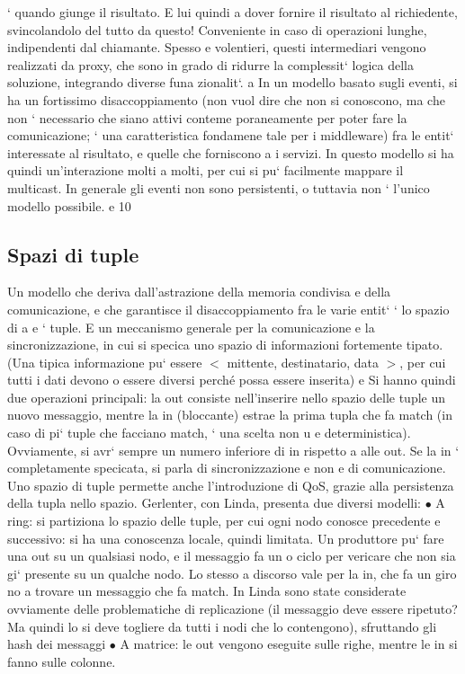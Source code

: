\documentclass[a4paper,12pt]{article}
\begin{document}
`
quando giunge il risultato. E lui quindi a dover fornire il risultato al
richiedente, svincolandolo del tutto da questo! Conveniente in caso di
operazioni lunghe, indipendenti dal chiamante.
Spesso e volentieri, questi intermediari vengono realizzati da proxy, che sono in
grado di ridurre la complessit` logica della soluzione, integrando diverse funa
zionalit`.
a
In un modello basato sugli eventi, si ha un fortissimo disaccoppiamento (non
vuol dire che non si conoscono, ma che non ` necessario che siano attivi conteme
poraneamente per poter fare la comunicazione; ` una caratteristica fondamene
tale per i middleware) fra le entit` interessate al risultato, e quelle che forniscono
a
i servizi. In questo modello si ha quindi un'interazione molti a molti, per cui si
pu` facilmente mappare il multicast. In generale gli eventi non sono persistenti,
o
tuttavia non ` l'unico modello possibile.
e
10
\newpage
\subsection{Spazi di tuple}
Un modello che deriva dall'astrazione della memoria condivisa e della comunicazione, e che garantisce il
disaccoppiamento fra le varie entit` ` lo spazio di
a e
`
tuple. E un meccanismo generale per la comunicazione e la sincronizzazione, in
cui si specica uno spazio di informazioni fortemente tipato. (Una tipica informazione pu` essere $<$ mittente,
destinatario, data $>$, per cui tutti i dati devono
o
essere diversi perché possa essere inserita)
e
Si hanno quindi due operazioni principali: la out consiste nell'inserire nello
spazio delle tuple un nuovo messaggio, mentre la in (bloccante) estrae la prima
tupla che fa match (in caso di pi` tuple che facciano match, ` una scelta non
u
e
deterministica). Ovviamente, si avr` sempre un numero inferiore di in rispetto
a
alle out. Se la in ` completamente specicata, si parla di sincronizzazione e non
e
di comunicazione. Uno spazio di tuple permette anche l'introduzione di QoS,
grazie alla persistenza della tupla nello spazio.
Gerlenter, con Linda, presenta due diversi modelli:
$\bullet$ A ring: si partiziona lo spazio delle tuple, per cui ogni nodo conosce
precedente e successivo: si ha una conoscenza locale, quindi limitata. Un
produttore pu` fare una out su un qualsiasi nodo, e il messaggio fa un
o
ciclo per vericare che non sia gi` presente su un qualche nodo. Lo stesso
a
discorso vale per la in, che fa un giro no a trovare un messaggio che fa
match. In Linda sono state considerate ovviamente delle problematiche
di replicazione (il messaggio deve essere ripetuto? Ma quindi lo si deve
togliere da tutti i nodi che lo contengono), sfruttando gli hash dei messaggi
$\bullet$ A matrice: le out vengono eseguite sulle righe, mentre le in si fanno sulle
colonne.
\end{document}
